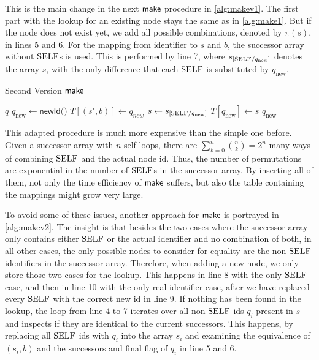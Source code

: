 This is the main change in the next $\operatorname{\textsf{make}}$ procedure in \autoref{alg:makev1}. The first part with the lookup for an existing node stays the same as in \autoref{alg:make1}. But if the node does not exist yet, we add all possible combinations, denoted by $\pi(s)$, in lines 5 and 6. For the mapping from identifier to $s$ and $b$, the successor array without $\mathrm{SELF}$s is used. This is performed by line 7, where $s_{[\mathrm{SELF} / q_{\text{new}}]}$ denotes the array $s$, with the only difference that each $\mathrm{SELF}$ is substituted by $q_{\text{new}}$. 
\par
\begin{algorithm}[htb]
\centering
\caption{Second Version $\operatorname{\textsf{make}}$}\label{alg:makev1}
\begin{algorithmic}[1]\smallskip
{}
\Return $q$
\Else
\State $q_{\text{new}} \gets \textsf{newId()}$
\State $T[(s',b)] \gets q_{new}$
\EndFor
\State $s \gets s_{[\mathrm{SELF} / q_{\text{new}}]}$
\State $T[q_{\text{new}}] \gets s$
\Return $q_{\text{new}}$
\EndIf
\end{algorithmic}
\end{algorithm}
This adapted procedure is much more expensive than the simple one before. Given a successor array with $n$ self-loops, there are $\sum_{k=0}^{n} \binom{n}{k} = 2^{n}$ many ways of combining $\mathrm{SELF}$ and the actual node id. Thus, the number of permutations are exponential in the number of $\mathrm{SELF}$s in the successor array. By inserting all of them, not only the time efficiency of $\operatorname{\textsf{make}}$ suffers, but also the table containing the mappings might grow very large.
\par
To avoid some of these issues, another approach for $\operatorname{\textsf{make}}$ is portrayed in \autoref{alg:makev2}. 
The insight is that besides the two cases where the successor array only contains either $\mathrm{SELF}$ or the actual identifier and no combination of both, in all other cases, the only possible nodes to consider for equality are the non-$\mathrm{SELF}$ identifiers in the successor array. Therefore, when adding a new node, we only store those two cases for the lookup. This happens in line 8 with the only $\mathrm{SELF}$ case, and then in line 10 with the only real identifier case, after we have replaced every $\mathrm{SELF}$ with the correct new id in line 9.
If nothing has been found in the lookup, the loop from line 4 to 7 iterates over all non-$\mathrm{SELF}$ ids $q_{i}$ present in $s$ and inspects if they are identical to the current successors. This happens, by replacing all $\mathrm{SELF}$ ids with $q_{i}$ into the array $s_{i}$ and examining the equivalence of $(s_{i},b)$ and the successors and final flag of $q_{i}$ in line 5 and 6.


